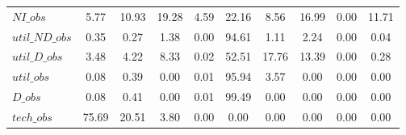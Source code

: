 \begin{center}
\begin{longtable}{lccccccccc}
$NI\_obs        $	 & 	         5.77	 & 	        10.93	 & 	        19.28	 & 	         4.59	 & 	        22.16	 & 	         8.56	 & 	        16.99	 & 	         0.00	 & 	        11.71 \\ 
$util\_ND\_obs  $	 & 	         0.35	 & 	         0.27	 & 	         1.38	 & 	         0.00	 & 	        94.61	 & 	         1.11	 & 	         2.24	 & 	         0.00	 & 	         0.04 \\ 
$util\_D\_obs   $	 & 	         3.48	 & 	         4.22	 & 	         8.33	 & 	         0.02	 & 	        52.51	 & 	        17.76	 & 	        13.39	 & 	         0.00	 & 	         0.28 \\ 
$util\_obs      $	 & 	         0.08	 & 	         0.39	 & 	         0.00	 & 	         0.01	 & 	        95.94	 & 	         3.57	 & 	         0.00	 & 	         0.00	 & 	         0.00 \\ 
$D\_obs         $	 & 	         0.08	 & 	         0.41	 & 	         0.00	 & 	         0.01	 & 	        99.49	 & 	         0.00	 & 	         0.00	 & 	         0.00	 & 	         0.00 \\ 
$tech\_obs      $	 & 	        75.69	 & 	        20.51	 & 	         3.80	 & 	         0.00	 & 	         0.00	 & 	         0.00	 & 	         0.00	 & 	         0.00	 & 	         0.00 \\ 
\end{longtable}
 \end{center}
